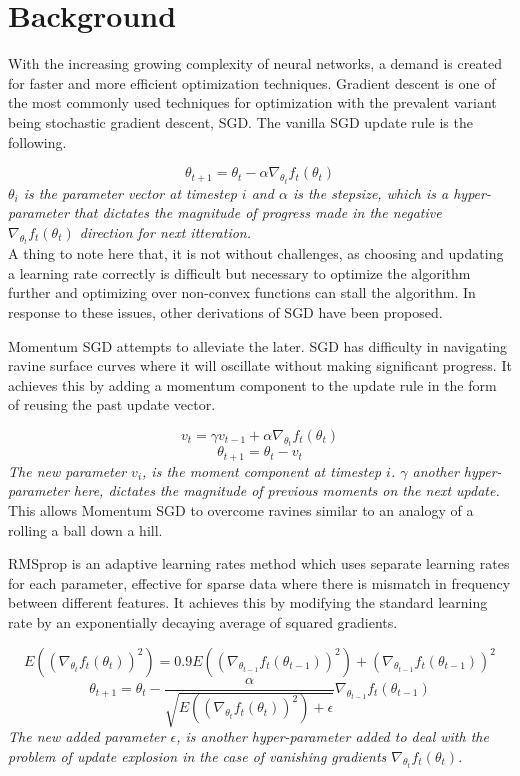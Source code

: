 \documentclass[nohyperref]{article}
\theoremstyle{plain}
\theoremstyle{definition}
\theoremstyle{remark}
\begin{document}
\section{Background}
With the increasing growing complexity of neural networks, a demand is created for faster and more efficient optimization techniques. Gradient descent is one of the most commonly used techniques for optimization with the prevalent variant being stochastic gradient descent, SGD. The vanilla SGD update rule is the following.

$$\theta_{t+1} = \theta_t - \alpha\nabla_{\theta_t}f_t(\theta_t)$$
\textit{$\theta_{i}$ is the parameter vector at timestep $i$ and $\alpha$ is the stepsize, which is a hyper-parameter that dictates the magnitude of progress made in the negative $\nabla_{\theta_t}f_t(\theta_t)$ direction for next itteration.} \\

A thing to note here that, it is not without challenges, as choosing and updating a learning rate correctly is difficult but necessary to optimize the algorithm further and optimizing over non-convex functions can stall the algorithm. In response to these issues, other derivations of SGD have been proposed.

Momentum SGD attempts to alleviate the later. SGD has difficulty in navigating ravine surface curves where it will oscillate without making significant progress. It achieves this by adding a momentum component to the update rule in the form of reusing the past update vector.

$$v_t = \gamma v_{t-1} + \alpha\nabla_{\theta_t}f_t(\theta_t)$$
$$\theta_{t+1} = \theta_t - v_t$$
\textit{The new parameter $v_{i}$, is the moment component at timestep $i$. $\gamma$ another hyper-parameter here, dictates the magnitude of previous moments on the next update.} \\

This allows Momentum SGD to overcome ravines similar to an analogy of a rolling a ball down a hill.

RMSprop is an adaptive learning rates method which uses separate learning rates for each parameter, effective for sparse data where there is mismatch in frequency between different features. It achieves this by modifying the standard learning rate by an exponentially decaying average of squared gradients.

$$E((\nabla_{\theta_t}f_t(\theta_t))^2) = 0.9E((\nabla_{\theta_{t-1}}f_t(\theta_{t-1}))^2) + (\nabla_{\theta_{t-1}}f_t(\theta_{t-1}))^2$$
$$\theta_{t+1} = \theta_t - \frac{\alpha}{\sqrt{E((\nabla_{\theta_t}f_t(\theta_t))^2)+\epsilon}}\nabla_{\theta_{t-1}}f_t(\theta_{t-1})$$
\textit{The new added parameter $\epsilon$, is another hyper-parameter added to deal with the problem of update explosion in the case of vanishing gradients $\nabla_{\theta_t}f_t(\theta_t)$. } \\
\end{document}
